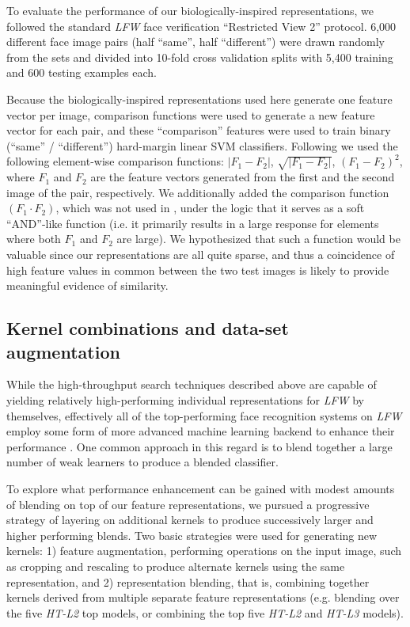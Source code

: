 To evaluate the performance of our biologically-inspired
representations, we followed the standard \emph{LFW} face verification
``Restricted View 2'' protocol.  6,000 different face image pairs (half
``same'', half ``different'') were drawn randomly from the sets and divided into
10-fold cross validation splits with 5,400 training and 600 testing examples
each.

Because the biologically-inspired representations used here generate one feature
vector per image, comparison functions were used to generate a new feature
vector for each pair, and these ``comparison'' features were used to train
binary (``same'' / ``different'') hard-margin linear SVM classifiers.  Following
\cite{pinto:cvpr09} we used the following element-wise comparison functions:
$|F_1 - F_2|$, $\sqrt{|F_1 - F_2|}$, $(F_1 - F_2)^2$, where $F_1$ and $F_2$
are the feature vectors generated from the first and the second image of the
pair, respectively.  We additionally added the comparison function $(F_1 \cdot
F_2)$, which was not used in \cite{pinto:cvpr09}, under the logic that it serves
as a soft ``AND''-like function (i.e.  it primarily results in a large response
for elements where both $F_1$ and $F_2$ are large). We hypothesized that such a
function would be valuable since our representations are all quite sparse, and
thus a coincidence of high feature values in common between the two test images
is likely to provide meaningful evidence of similarity.



\subsection{Kernel combinations and data-set augmentation}

While the high-throughput search techniques described above are capable of
yielding relatively high-performing individual representations for \emph{LFW} by
themselves, effectively all of the top-performing face recognition systems on
\emph{LFW} employ some form of more advanced machine learning backend to enhance
their performance \cite{taigman:bmvc09,wolf:accv09,kumar:iccv09,cao2010face}.  One common approach in this
regard is to blend together a large number of weak learners to produce
a blended classifier.

To explore what performance enhancement can be gained with modest amounts of
blending on top of our feature representations, we pursued a progressive strategy
of layering on additional kernels to produce successively larger and higher
performing blends. Two basic strategies were used for generating new kernels: 1)
feature augmentation, performing operations on the input image, such as cropping
and rescaling to produce alternate kernels using the same representation, and 2)
representation blending, that is, combining together kernels derived from
multiple separate feature representations (e.g. blending over the five
\emph{HT-L2} top models, or combining the top five \emph{HT-L2} and \emph{HT-L3}
models).

